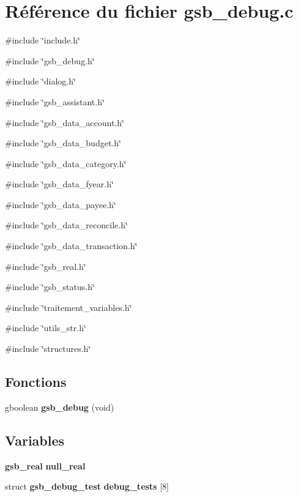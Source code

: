 \section{Référence du fichier gsb\_\-debug.c}
\label{gsb__debug_8c}
{\ttfamily \#include \char`\"{}include.h\char`\"{}}\par
{\ttfamily \#include \char`\"{}gsb\_\-debug.h\char`\"{}}\par
{\ttfamily \#include \char`\"{}dialog.h\char`\"{}}\par
{\ttfamily \#include \char`\"{}gsb\_\-assistant.h\char`\"{}}\par
{\ttfamily \#include \char`\"{}gsb\_\-data\_\-account.h\char`\"{}}\par
{\ttfamily \#include \char`\"{}gsb\_\-data\_\-budget.h\char`\"{}}\par
{\ttfamily \#include \char`\"{}gsb\_\-data\_\-category.h\char`\"{}}\par
{\ttfamily \#include \char`\"{}gsb\_\-data\_\-fyear.h\char`\"{}}\par
{\ttfamily \#include \char`\"{}gsb\_\-data\_\-payee.h\char`\"{}}\par
{\ttfamily \#include \char`\"{}gsb\_\-data\_\-reconcile.h\char`\"{}}\par
{\ttfamily \#include \char`\"{}gsb\_\-data\_\-transaction.h\char`\"{}}\par
{\ttfamily \#include \char`\"{}gsb\_\-real.h\char`\"{}}\par
{\ttfamily \#include \char`\"{}gsb\_\-status.h\char`\"{}}\par
{\ttfamily \#include \char`\"{}traitement\_\-variables.h\char`\"{}}\par
{\ttfamily \#include \char`\"{}utils\_\-str.h\char`\"{}}\par
{\ttfamily \#include \char`\"{}structures.h\char`\"{}}\par
\subsection*{Fonctions}
\begin{DoxyCompactItemize}
\item 
gboolean {\bf gsb\_\-debug} (void)
\end{DoxyCompactItemize}
\subsection*{Variables}
\begin{DoxyCompactItemize}
\item 
{\bf gsb\_\-real} {\bf null\_\-real}
\item 
struct {\bf gsb\_\-debug\_\-test} {\bf debug\_\-tests} [8]
\end{DoxyCompactItemize}


